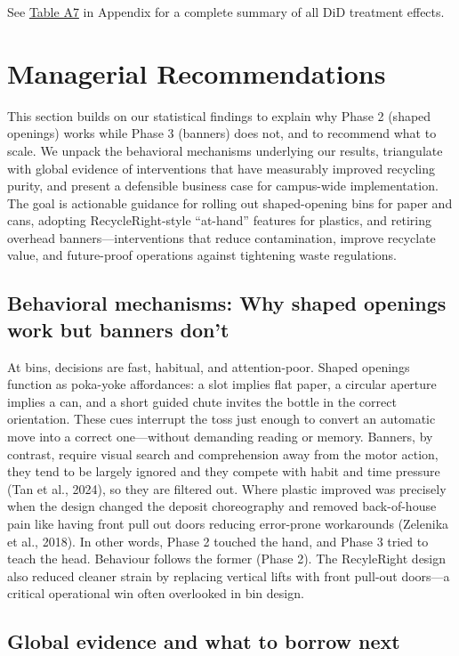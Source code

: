 \documentclass[12pt]{article}
\begin{document}
See \hyperref[tab:summary]{Table A7} in Appendix for a complete summary of all DiD treatment effects.

\section{Managerial Recommendations}

This section builds on our statistical findings to explain why Phase 2 (shaped openings) works while Phase 3 (banners) does not, and to recommend what to scale. We unpack the behavioral mechanisms underlying our results, triangulate with global evidence of interventions that have measurably improved recycling purity, and present a defensible business case for campus-wide implementation. The goal is actionable guidance for rolling out shaped-opening bins for paper and cans, adopting RecycleRight-style ``at-hand'' features for plastics, and retiring overhead banners---interventions that reduce contamination, improve recyclate value, and future-proof operations against tightening waste regulations.

\subsection{Behavioral mechanisms: Why shaped openings work but banners don't}

At bins, decisions are fast, habitual, and attention-poor. Shaped openings function as poka-yoke affordances: a slot implies flat paper, a circular aperture implies a can, and a short guided chute invites the bottle in the correct orientation. These cues interrupt the toss just enough to convert an automatic move into a correct one---without demanding reading or memory. Banners, by contrast, require visual search and comprehension away from the motor action, they tend to be largely ignored and they compete with habit and time pressure (Tan et al., 2024), so they are filtered out. Where plastic improved was precisely when the design changed the deposit choreography and removed back-of-house pain like having front pull out doors reducing error-prone workarounds (Zelenika et al., 2018). In other words, Phase 2 touched the hand, and Phase 3 tried to teach the head. Behaviour follows the former (Phase 2). The RecyleRight design also reduced cleaner strain by replacing vertical lifts with front pull-out doors---a critical operational win often overlooked in bin design.

\subsection{Global evidence and what to borrow next}
\end{document}
